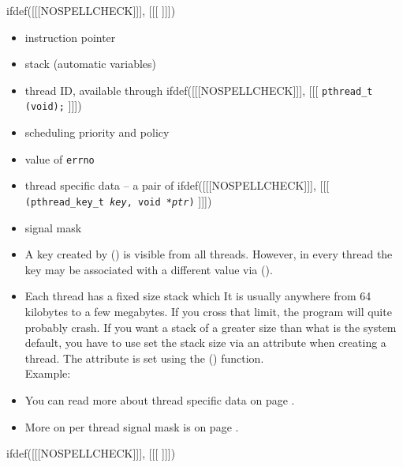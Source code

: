 
ifdef([[[NOSPELLCHECK]]], [[[
]]])

\begin{slide}
\begin{itemize}
\item instruction pointer
\item stack (automatic variables)
\item thread ID, available through
ifdef([[[NOSPELLCHECK]]], [[[
\texttt{pthread\_t (void);}
]]])
\item scheduling priority and policy
\item value of \texttt{errno}
\item thread specific data -- a pair of
ifdef([[[NOSPELLCHECK]]], [[[
\texttt{(pthread\_key\_t \emph{key}, void *\emph{ptr})}
]]])
\item signal mask
\end{itemize}
\end{slide}

\begin{itemize}
\item A key created by () is visible from all
threads. However, in every thread the key may be associated with a different
value via ().
\item Each thread has a fixed size stack which   It is usually anywhere from 64 kilobytes to a few megabytes.  If you
cross that limit, the program will quite probably crash.  If you want a stack of
a greater size than what is the system default, you have to use
set the stack size via an attribute when creating a thread.
The attribute is set using the () function.
\\
Example: 
\item You can read more about thread specific data on page
\pageref{THREAD_SPECIFIC_DATA}.
\item More on per thread signal mask is on page \pageref{PTHREADSIGMASK}.
\end{itemize}


ifdef([[[NOSPELLCHECK]]], [[[
]]])

